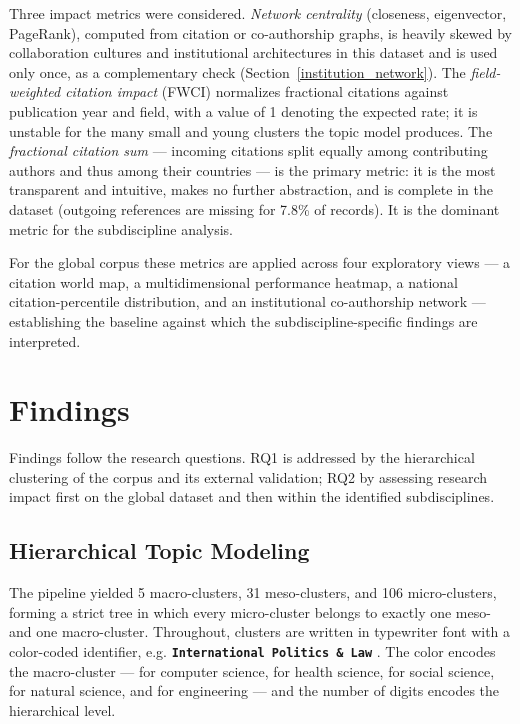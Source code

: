 \documentclass{article}
\begin{document}
	Three impact metrics were considered. \textit{Network centrality} (closeness, eigenvector, PageRank), computed from citation or co-authorship graphs, is heavily skewed by collaboration cultures and institutional architectures in this dataset and is used only once, as a complementary check (Section~\ref{institution_network}). The \textit{field-weighted citation impact} (FWCI) normalizes fractional citations against publication year and field, with a value of 1 denoting the expected rate; it is unstable for the many small and young clusters the topic model produces. The \textit{fractional citation sum} --- incoming citations split equally among contributing authors and thus among their countries --- is the primary metric: it is the most transparent and intuitive, makes no further abstraction, and is complete in the dataset (outgoing references are missing for 7.8\% of records). It is the dominant metric for the subdiscipline analysis.
	
	For the global corpus these metrics are applied across four exploratory views --- a citation world map, a multidimensional performance heatmap, a national citation-percentile distribution, and an institutional co-authorship network --- establishing the baseline against which the subdiscipline-specific findings are interpreted.
	
	\section{Findings}
	\label{sec:findings}
	
	Findings follow the research questions. RQ1 is addressed by the hierarchical clustering of the corpus and its external validation; RQ2 by assessing research impact first on the global dataset and then within the identified subdisciplines.
	
	\subsection{Hierarchical Topic Modeling}
	\label{sec:results_topic_modeling}
	
	The pipeline yielded 5 macro-clusters, 31 meso-clusters, and 106 micro-clusters, forming a strict tree in which every micro-cluster belongs to exactly one meso- and one macro-cluster. Throughout, clusters are written in typewriter font with a color-coded identifier, e.g. \textbf{\texttt{International Politics \& Law}} . The color encodes the macro-cluster ---  for computer science,  for health science,  for social science,  for natural science, and  for engineering --- and the number of digits encodes the hierarchical level.
	
\end{document}
